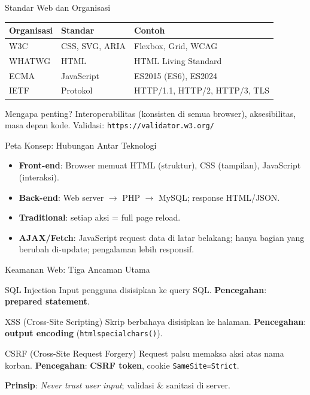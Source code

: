 \documentclass[handout]{beamer}
\begin{document}
\begin{frame}{Standar Web dan Organisasi}
	\begin{tabular}{|l|l|l|}
		\hline
		\textbf{Organisasi} & \textbf{Standar} & \textbf{Contoh} \\
		\hline
		W3C & CSS, SVG, ARIA & Flexbox, Grid, WCAG \\
		\hline
		WHATWG & HTML & HTML Living Standard \\
		\hline
		ECMA & JavaScript & ES2015 (ES6), ES2024 \\
		\hline
		IETF & Protokol & HTTP/1.1, HTTP/2, HTTP/3, TLS \\
		\hline
	\end{tabular}
	\vspace{0.5em}
	\begin{block}{Mengapa penting?}
		Interoperabilitas (konsisten di semua browser), aksesibilitas, masa depan kode. Validasi: \texttt{https://validator.w3.org/}
	\end{block}
\end{frame}

\begin{frame}{Peta Konsep: Hubungan Antar Teknologi}
	\begin{itemize}
		\item \textbf{Front-end}: Browser memuat HTML (struktur), CSS (tampilan), JavaScript (interaksi).
		\item \textbf{Back-end}: Web server $\to$ PHP $\to$ MySQL; response HTML/JSON.
		\item \textbf{Traditional}: setiap aksi = full page reload.
		\item \textbf{AJAX/Fetch}: JavaScript request data di latar belakang; hanya bagian yang berubah di-update; pengalaman lebih responsif.
	\end{itemize}
\end{frame}

\begin{frame}{Keamanan Web: Tiga Ancaman Utama}
	\begin{block}{SQL Injection}
		Input pengguna disisipkan ke query SQL. \textbf{Pencegahan}: \textbf{prepared statement}.
	\end{block}
	\begin{block}{XSS (Cross-Site Scripting)}
		Skrip berbahaya disisipkan ke halaman. \textbf{Pencegahan}: \textbf{output encoding} (\texttt{htmlspecialchars()}).
	\end{block}
	\begin{block}{CSRF (Cross-Site Request Forgery)}
		Request palsu memaksa aksi atas nama korban. \textbf{Pencegahan}: \textbf{CSRF token}, cookie \texttt{SameSite=Strict}.
	\end{block}
	\textbf{Prinsip}: \textit{Never trust user input}; validasi \& sanitasi di server.
\end{frame}
\end{document}

